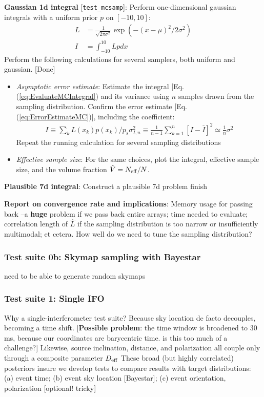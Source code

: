\documentclass[twocolumn,prd,nofootinbib]{revtex4}
\newcommand\editremark[1]{{\color{red} #1}}
\begin{document}
\begin{widetext}
\begin{widetext}
\noindent \textbf{Gaussian 1d integral} [\texttt{test\_mcsamp}]: Perform  one-dimensional gaussian integrals with a uniform
prior $p$ on $[-10,10]$:
\begin{align}
L &= \frac{1}{\sqrt{2\pi \sigma^2} } \exp (-(x-\mu)^2/2\sigma^2)  \\
I &= \int_{-10}^{10} L  p dx
\end{align}
Perform the following calculations for several samplers, both uniform and gaussian.  [Done]
\begin{itemize}
\item \emph{Asymptotic error estimate}: Estimate the integral [Eq. (\ref{eq:EvaluateMCIntegral}) and its variance using
  $n$ samples drawn from the sampling distribution.  Confirm the error   estimate [Eq. (\ref{eq:ErrorEstimateMC})], including the coefficient:
\begin{align}
I \equiv \sum_k L(x_k) p(x_k)/p_s
\sigma_{I,n}^2 \equiv \frac{1}{n-1}\sum_{k=1}^n[ I - \bar{I}]^2 \simeq \frac{1}{n}  \sigma^2
\end{align}
Repeat the running calculation for several sampling distributions
\item \emph{Effective sample size}: For the same choices, plot the integral, effective sample size, and the volume
  fraction $\hat{V}=N_{\rm eff}/N$. 
\end{itemize}

\noindent \textbf{Plausible 7d integral}: Construct a plausible 7d problem \editremark{finish}


\noindent \textbf{Report on convergence rate and implications}: Memory usage for passing back --a \textbf{huge} problem
if we pass back entire arrays; time needed to evaluate;
correlation length of $\hat{L}$ if the sampling distribution is too narrow or insufficiently multimodal; et cetera.  How well do we need to tune the sampling distribution?


\subsubsection{Test suite 0b: Skymap sampling with Bayestar}


\editremark{need to be able to generate random skymaps}


\subsubsection{Test suite 1: Single IFO}

Why a single-interferometer test suite?  Because sky location de facto decouples, becoming a time
shift. [\textbf{Possible problem}: the time window is broadened to 30 ms, because our coordinates are barycentric
  time. \editremark{is this too much of a challenge?}] 
Likewise, source inclination, distance, and polarization all couple only through a composite parameter $D_{\rm eff}$
%
These broad (but highly correlated) posteriors insure we develop tests to compare results with target distributions: (a) event time; (b) event sky location [Bayestar]; (c)
event orientation, polarization [optional! tricky]



\end{widetext}
\end{widetext}
\end{document}
